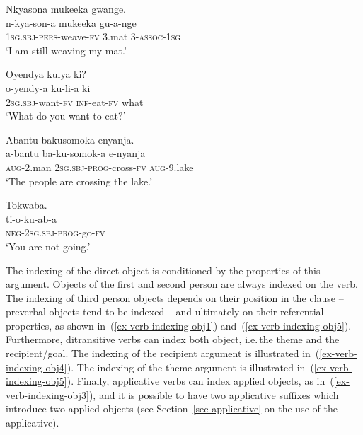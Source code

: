 \ea \label{ex-verb-indexing-subject}
    \begin{xlist}	
\ex	\label{ex-verb-indexing-subject1}
	\glll Nkyasona mukeeka gwange.\\
		n-kya-son-a mukeeka gu-a-nge\\
 	\textsc{1sg.sbj}-\textsc{pers}-weave-\textsc{fv} 3.mat 3-\textsc{assoc}-\textsc{1sg}\\
	\glt  ‘I am still weaving my mat.'
        
\ex	\label{ex-verb-indexing-subject2}
    	\glll Oyendya kulya ki?\\
	o-yendy-a ku-li-a ki\\
	 2\textsc{sg.sbj}-want-\textsc{fv} \textsc{inf}-eat-\textsc{fv} what\\
    	\glt ‘What do you want to eat?'
    
\ex \label{ex-verb-indexing-subject3}
    	\glll Abantu bakusomoka enyanja.\\
	a-bantu ba-ku-somok-a e-nyanja\\
	\textsc{aug}-2.man 2\textsc{sg.sbj}-\textsc{prog}-cross-\textsc{fv} \textsc{aug}-9.lake\\
   	 \glt ‘The people are crossing the lake.'
    
\ex	\label{ex-verb-indexing-subject4}
    	\glll Tokwaba.\\
	  ti-o-ku-ab-a\\
		\textsc{neg}-2\textsc{sg.sbj}-\textsc{prog}-go-\textsc{fv}\\
	\glt ‘You are not going.' 
        \end{xlist}	
\z

The indexing of the direct object is conditioned by the properties of this argument.  
Objects of the first and second person are always indexed on the verb. 
The indexing of third person objects depends on their position in the clause – preverbal objects tend to be indexed – and ultimately on their referential properties, as shown in~(\ref{ex-verb-indexing-obj1}) and~(\ref{ex-verb-indexing-obj5}). 
Furthermore, ditransitive verbs can index both object, i.e.\,the theme and the recipient/goal.  
The indexing of the recipient argument is illustrated in~(\ref{ex-verb-indexing-obj4}). 
The indexing of the theme argument is illustrated in~(\ref{ex-verb-indexing-obj5}).
Finally, applicative verbs can index applied objects, as in~(\ref{ex-verb-indexing-obj3}), and it is possible to have two applicative suffixes which introduce two applied objects (see Section~\ref{sec-applicative} on the use of the applicative).

